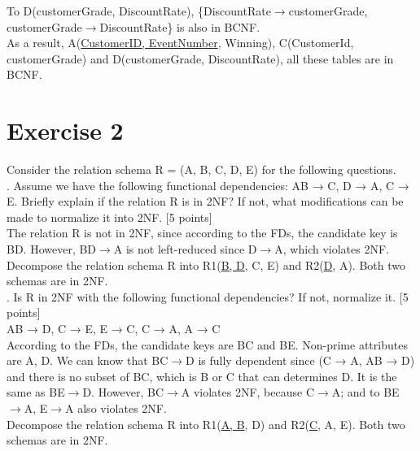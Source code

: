 \documentclass[]{article}
\begin{document}
	\noindent To D(customerGrade, DiscountRate), \{DiscountRate$\rightarrow$customerGrade, customerGrade$\rightarrow$DiscountRate\} is also in BCNF. \\
	
	\noindent As a result, A(\underline{CustomerID, EventNumber}, Winning), C(CustomerId, customerGrade) and D(customerGrade, DiscountRate), all these tables are in BCNF.  \\
	
	\section{Exercise 2}
	
	Consider the relation schema R = (A, B, C, D, E) for the following questions.  \\
	
	. Assume we have the following functional dependencies: AB → C, D → A, C → E. Briefly explain if the relation R is in 2NF? If not, what modifications can be made to normalize it into 2NF. [5 points]   \\
	
	\noindent The relation R is not in 2NF, since according to the FDs, the candidate key is BD. However, BD$\rightarrow$A is not left-reduced since D$\rightarrow$A, which violates 2NF.  \\
	
	\noindent Decompose the relation schema R into R1(\underline{B, D}, C, E) and R2(\underline{D}, A). Both two schemas are in 2NF. \\
	
	. Is R in 2NF with the following functional dependencies? If not, normalize it. [5 points]   \\
	
	\noindent AB → D, C → E, E → C, C → A, A → C  \\
	
	\noindent According to the FDs, the candidate keys are BC and BE. Non-prime attributes are A, D. We can know that BC$\rightarrow$D is fully dependent since (C → A, AB → D) and there is no subset of BC, which is B or C that can determines D. It is the same as BE$\rightarrow$D. However, BC$\rightarrow$A violates 2NF, because C$\rightarrow$A; and to BE$\rightarrow$A, E$\rightarrow$A also violates 2NF.  \\
	
	\noindent Decompose the relation schema R into R1(\underline{A, B}, D) and R2(\underline{C}, A, E). Both two schemas are in 2NF. \\
	
\end{document}
